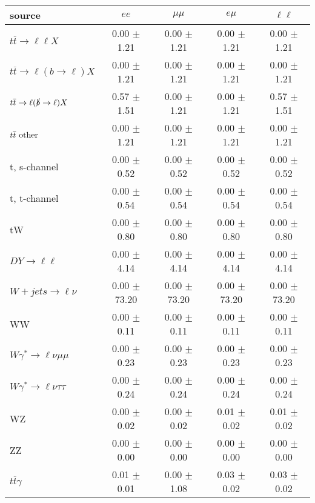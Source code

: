 \begin{tabular}{l|cccc} \hline\hline
source & $ee$ & $\mu\mu$ & $e\mu$ & $\ell\ell $ \\
\hline
$t\overline{t} \rightarrow \ell \ell X$ &  0.00 $\pm$  1.21 &  0.00 $\pm$  1.21 &  0.00 $\pm$  1.21 &  0.00 $\pm$  1.21 \\
$t\overline{t} \rightarrow \ell (b \rightarrow \ell) X$ &  0.00 $\pm$  1.21 &  0.00 $\pm$  1.21 &  0.00 $\pm$  1.21 &  0.00 $\pm$  1.21 \\
$t\overline{t} \rightarrow \ell (\slashed b \rightarrow \ell) X$ &  0.57 $\pm$  1.51 &  0.00 $\pm$  1.21 &  0.00 $\pm$  1.21 &  0.57 $\pm$  1.51 \\
        $t\overline{t}\ \rm{other}$ &  0.00 $\pm$  1.21 &  0.00 $\pm$  1.21 &  0.00 $\pm$  1.21 &  0.00 $\pm$  1.21 \\
\hline
                       t, s-channel &  0.00 $\pm$  0.52 &  0.00 $\pm$  0.52 &  0.00 $\pm$  0.52 &  0.00 $\pm$  0.52 \\
                       t, t-channel &  0.00 $\pm$  0.54 &  0.00 $\pm$  0.54 &  0.00 $\pm$  0.54 &  0.00 $\pm$  0.54 \\
                                 tW &  0.00 $\pm$  0.80 &  0.00 $\pm$  0.80 &  0.00 $\pm$  0.80 &  0.00 $\pm$  0.80 \\
\hline
         $DY \rightarrow \ell \ell$ &  0.00 $\pm$  4.14 &  0.00 $\pm$  4.14 &  0.00 $\pm$  4.14 &  0.00 $\pm$  4.14 \\
      $W+jets \rightarrow \ell \nu$ &  0.00 $\pm$ 73.20 &  0.00 $\pm$ 73.20 &  0.00 $\pm$ 73.20 &  0.00 $\pm$ 73.20 \\
                                 WW &  0.00 $\pm$  0.11 &  0.00 $\pm$  0.11 &  0.00 $\pm$  0.11 &  0.00 $\pm$  0.11 \\
\hline
$W\gamma^{*} \rightarrow \ell \nu \mu\mu$ &  0.00 $\pm$  0.23 &  0.00 $\pm$  0.23 &  0.00 $\pm$  0.23 &  0.00 $\pm$  0.23 \\
$W\gamma^{*} \rightarrow \ell \nu \tau\tau$ &  0.00 $\pm$  0.24 &  0.00 $\pm$  0.24 &  0.00 $\pm$  0.24 &  0.00 $\pm$  0.24 \\
                                 WZ &  0.00 $\pm$  0.02 &  0.00 $\pm$  0.02 &  0.01 $\pm$  0.02 &  0.01 $\pm$  0.02 \\
                                 ZZ &  0.00 $\pm$  0.00 &  0.00 $\pm$  0.00 &  0.00 $\pm$  0.00 &  0.00 $\pm$  0.00 \\
\hline
              $t\overline{t}\gamma$ &  0.01 $\pm$  0.01 &  0.00 $\pm$  1.08 &  0.03 $\pm$  0.02 &  0.03 $\pm$  0.02 \\

\end{tabular}
